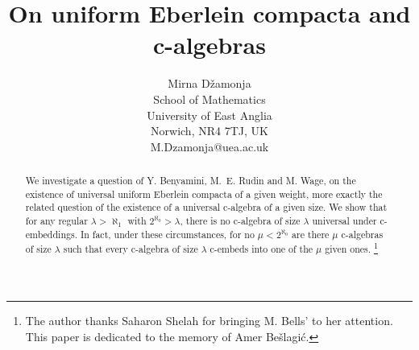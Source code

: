 \newcommand{\order}{\prec}
\newcommand{\club}{\clubsuit}
\newcommand{\bd}{{\rm bd}}                      %
\newcommand{\into}{\rightarrow}

\newcommand{\rest}{\upharpoonright}  %
\newcommand{\for}{\forall}
\newcommand{\nacc}{\mathop{\rm nacc}}
\newcommand{\acc}{\mathop{\rm acc}}
\newcommand{\cl}{\mathop{\rm cl}}
\newcommand{\cov}{\mathop{\rm cov}}
\newcommand{\gl}{\mathop{\rm gl}}
\newcommand{\scl}{\mathop{\rm scl}}
\newcommand{\satisfies}{\vDash}
\newcommand{\deq}{\buildrel{\rm def}\over =}
\newcommand{\Min}{\mathop{\rm Min}}%
\newcommand{\mod}{\mathop{\rm mod}}

\newcommand{\AAA}{{\cal A}}
\newcommand{\BB}{{\cal B}}
\newcommand{\CC}{{\cal C}}
\newcommand{\DD}{{\cal D}}
\newcommand{\EE}{{\cal E}}
\newcommand{\FF}{{\cal F}}
\newcommand{\GG}{{\cal G}}
\newcommand{\HH}{{\cal H}}
\newcommand{\II}{{\cal I}}
\newcommand{\JJ}{{\cal J}}
\newcommand{\KK}{{\cal K}}
\newcommand{\PP}{{\cal P}}
\newcommand{\TT}{{\cal T}}

\newcommand{\Piba}{\Pi^\beta_\alpha}
\newcommand{\piba}{\pi_\alpha^\beta}  %

%
\title{On uniform Eberlein compacta and c-algebras}
\author{Mirna D\v zamonja\\
School of Mathematics\\
University of East Anglia\\
Norwich, NR4 7TJ, UK\\
\scriptsize{M.Dzamonja@uea.ac.uk}}




\baselineskip=16pt
\raggedbottom

\maketitle

\begin{abstract} We investigate a question of Y. Benyamini, M.~E. Rudin and
M. Wage, on the existence of universal uniform Eberlein compacta of a
given weight, more exactly the related question of the
existence of a universal c-algebra of a given size. We show that for any
regular $\lambda>\aleph_1$ with
$2^{\aleph_0}>\lambda$, there is no
c-algebra of size $\lambda$ universal under c-embeddings.
In fact, under these circumstances, for no $\mu<2^{\aleph_0}$
are there $\mu$ c-algebras of size $\lambda$ such that
every c-algebra of size $\lambda$ c-embeds into
one of the $\mu$ given ones.
{\footnote{The author thanks Saharon Shelah for bringing M. Bells' \cite{Bell}
to her attention.
This paper is dedicated to the memory of Amer Be\v slagi\'c.}
}
\end{abstract} 

